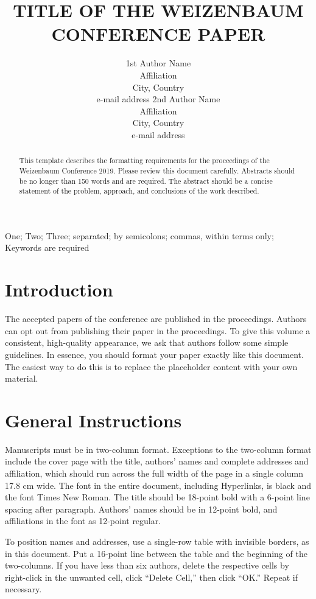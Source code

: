 \documentclass{wzbconf}
\title{TITLE OF THE WEIZENBAUM CONFERENCE PAPER}
\author{%
  1st Author Name \\ Affiliation \\ City, Country \\ e-mail address
  \And
  2nd Author Name \\ Affiliation \\ City, Country \\ e-mail address}
\newcommand{\q}[1]{\enquote{#1}}
\begin{document}
\maketitle

\begin{abstract}
  This template describes the formatting requirements for the proceedings of the Weizenbaum Conference 2019.  Please review this document carefully.  Abstracts should be no longer than 150 words and are required.  The abstract should be a concise statement of the problem, approach, and conclusions of the work described.
\end{abstract}

\begin{keywords}
  One; Two; Three; separated; by semicolons; commas, within terms only; Keywords are required
\end{keywords}

\twocolumn


\section{Introduction}

The accepted papers of the conference are published in the proceedings.  Authors can opt out from publishing their paper in the proceedings.  To give this volume a consistent, high-quality appearance, we ask that authors follow some simple guidelines.  In essence, you should format your paper exactly like this document.  The easiest way to do this is to replace the placeholder content with your own material.

\section{General Instructions}

Manuscripts must be in two-column format.  Exceptions to the two-column format include the cover page with the title, authors’ names and complete addresses and affiliation, which should run across the full width of the page in a single column 17.8 cm wide.  The font in the entire document, including Hyperlinks, is black and the font Times New Roman.  The title should be 18-point bold with a 6-point line spacing after paragraph.  Authors’ names should be in 12-point bold, and affiliations in the font as 12-point regular.

To position names and addresses, use a single-row table with invisible borders, as in this document.  Put a 16-point line between the table and the beginning of the two-columns.  If you have less than six authors, delete the respective cells by right-click in the unwanted cell, click \q{Delete Cell,} then click \q{OK.} Repeat if necessary.
\end{document}
